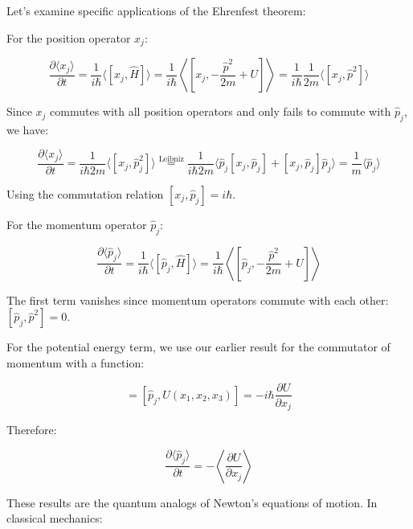 Let's examine specific applications of the Ehrenfest theorem:

For the position operator $x_j$:

\begin{equation}
\frac{\partial\langle x_j\rangle}{\partial t} = \frac{1}{i\hbar}\langle[x_j,\hat{H}]\rangle = \frac{1}{i\hbar}\left\langle\left[x_j,-\frac{\hat{p}^2}{2m}+U\right]\right\rangle = \frac{1}{i\hbar}\frac{1}{2m}\langle[x_j,\hat{p}^2]\rangle
\end{equation}

Since $x_j$ commutes with all position operators and only fails to commute with $\hat{p}_j$, we have:

\begin{equation}
\frac{\partial\langle x_j\rangle}{\partial t} = \frac{1}{i\hbar 2m}\langle[x_j,\hat{p}_j^2]\rangle \stackrel{\text{Leibniz}}{=} \frac{1}{i\hbar 2m}\langle\hat{p}_j[x_j,\hat{p}_j]+[x_j,\hat{p}_j]\hat{p}_j\rangle = \frac{1}{m}\langle\hat{p}_j\rangle
\end{equation}

Using the commutation relation $[x_j,\hat{p}_j] = i\hbar$.

For the momentum operator $\hat{p}_j$:

\begin{equation}
\frac{\partial\langle\hat{p}_j\rangle}{\partial t} = \frac{1}{i\hbar}\langle[\hat{p}_j,\hat{H}]\rangle = \frac{1}{i\hbar}\left\langle\left[\hat{p}_j,-\frac{\hat{p}^2}{2m}+U\right]\right\rangle
\end{equation}

The first term vanishes since momentum operators commute with each other: $[\hat{p}_j,\hat{p}^2] = 0$.

For the potential energy term, we use our earlier result for the commutator of momentum with a function:

\begin{equation}
[\hat{p}_j,U] = [\hat{p}_j,U(x_1,x_2,x_3)] = -i\hbar\frac{\partial U}{\partial x_j}
\end{equation}

Therefore:

\begin{equation}
\frac{\partial\langle\hat{p}_j\rangle}{\partial t} = -\left\langle\frac{\partial U}{\partial x_j}\right\rangle
\end{equation}

These results are the quantum analogs of Newton's equations of motion. In classical mechanics:


